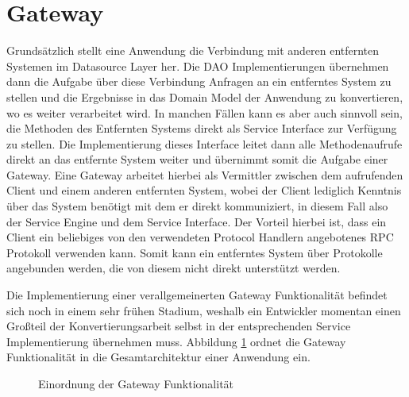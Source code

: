 \section{Gateway}
Grundsätzlich stellt eine Anwendung die Verbindung mit anderen entfernten
Systemen im Datasource Layer her. Die \ac{DAO} Implementierungen übernehmen dann
die Aufgabe über diese Verbindung Anfragen an ein entferntes System zu stellen
und die Ergebnisse in das Domain Model der Anwendung zu konvertieren, wo es weiter
verarbeitet wird. In manchen Fällen kann es aber auch sinnvoll sein, die
Methoden des Entfernten Systems direkt als Service Interface zur Verfügung zu stellen. Die
Implementierung dieses Interface leitet dann alle Methodenaufrufe direkt an das
entfernte System weiter und übernimmt somit die Aufgabe einer Gateway. Eine
Gateway arbeitet hierbei als Vermittler zwischen dem aufrufenden Client und einem
anderen entfernten System, wobei der Client lediglich Kenntnis über das System
benötigt mit dem er direkt kommuniziert, in diesem Fall also der Service Engine
und dem Service Interface. Der Vorteil hierbei ist, dass ein Client ein
beliebiges von den verwendeten Protocol Handlern angebotenes \ac{RPC}
Protokoll verwenden kann. Somit kann ein entferntes System über
Protokolle angebunden werden, die von diesem nicht direkt unterstützt werden.

Die Implementierung einer verallgemeinerten Gateway Funktionalität befindet sich
noch in einem sehr frühen Stadium, weshalb ein Entwickler momentan einen
Großteil der Konvertierungsarbeit selbst in der entsprechenden Service Implementierung
übernehmen muss. Abbildung \ref{ill:gateway} ordnet die Gateway
Funktionalität in die Gesamtarchitektur einer Anwendung ein.

\begin{figure}
	\caption{Einordnung der Gateway Funktionalität}
	\label{ill:gateway}
\end{figure}